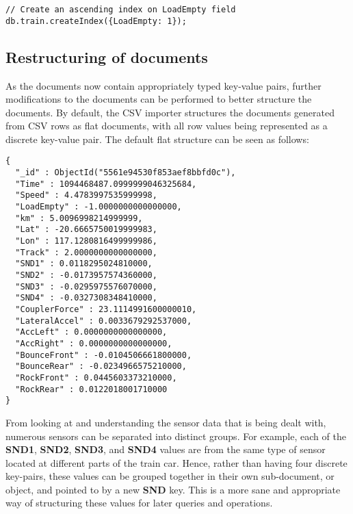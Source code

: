 \documentclass[a4paper,11pt]{article}
\begin{document}
\begin{lstlisting}[caption=Creating an index on ``LoadEmpty'' key in ``train'' collection.]
// Create an ascending index on LoadEmpty field
db.train.createIndex({LoadEmpty: 1});
\end{lstlisting}



\subsection{Restructuring of documents} %
\label{sub:restructuring_of_documents}

As the documents now contain appropriately typed key-value pairs, further modifications to the documents can be performed
to better structure the documents. By default, the CSV importer structures the documents generated from CSV rows as flat
documents, with all row values being represented as a discrete key-value pair. The default flat structure can be seen as
follows:

\begin{lstlisting}[caption=Original ``flat'' document structure.]
{
  "_id" : ObjectId("5561e94530f853aef8bbfd0c"),
  "Time" : 1094468487.0999999046325684,
  "Speed" : 4.4783997535999998,
  "LoadEmpty" : -1.0000000000000000,
  "km" : 5.0096998214999999,
  "Lat" : -20.6665750019999983,
  "Lon" : 117.1280816499999986,
  "Track" : 2.0000000000000000,
  "SND1" : 0.0118295024810000,
  "SND2" : -0.0173957574360000,
  "SND3" : -0.0295975576070000,
  "SND4" : -0.0327308348410000,
  "CouplerForce" : 23.1114991600000010,
  "LateralAccel" : 0.0033679292537000,
  "AccLeft" : 0.0000000000000000,
  "AccRight" : 0.0000000000000000,
  "BounceFront" : -0.0104506661800000,
  "BounceRear" : -0.0234966575210000,
  "RockFront" : 0.0445603373210000,
  "RockRear" : 0.0122018001710000
}
\end{lstlisting}

From looking at and understanding the
sensor data that is being dealt with, numerous sensors can be separated into distinct groups. For example, each of the
\textbf{SND1}, \textbf{SND2}, \textbf{SND3}, and \textbf{SND4} values are from the same type of sensor located at different
parts of the train car. Hence, rather than having four discrete key-pairs, these values can be grouped together in their
own sub-document, or object, and pointed to by a new \textbf{SND} key. This is a more sane and appropriate way of
structuring these values for later queries and operations.
\end{document}
